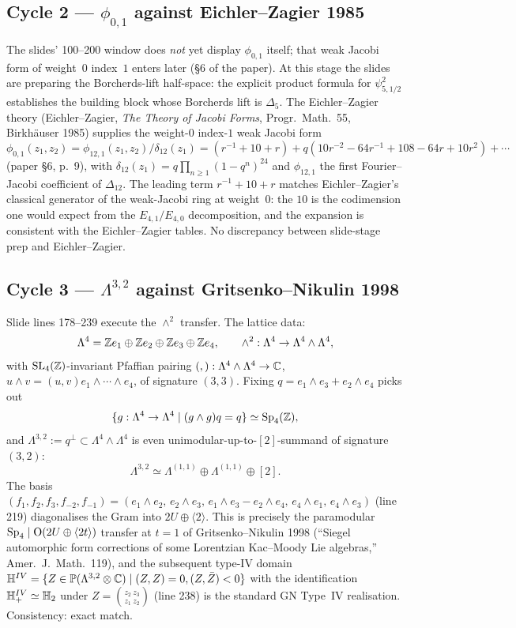 \subsection*{Cycle 2 --- $\phi_{0,1}$ against Eichler--Zagier 1985}

The slides' 100--200 window does \emph{not} yet display $\phi_{0,1}$
itself; that weak Jacobi form of weight~$0$ index~$1$ enters later (\S 6
of the paper). At this stage the slides are preparing the Borcherds-lift
half-space: the explicit product formula for $\psi_{5,1/2}^2$ establishes
the building block whose Borcherds lift is $\Delta_5$. The
Eichler--Zagier theory (Eichler--Zagier, \emph{The Theory of Jacobi
Forms}, Progr.\ Math.~55, Birkh\"auser 1985) supplies the
weight-$0$ index-$1$ weak Jacobi form
\[
\phi_{0,1}(z_1,z_2)=\phi_{12,1}(z_1,z_2)/\delta_{12}(z_1)
=(r^{-1}+10+r)+q(10r^{-2}-64r^{-1}+108-64r+10r^2)+\cdots
\]
(paper \S 6, p.~9), with $\delta_{12}(z_1)=q\prod_{n\geq 1}(1-q^n)^{24}$
and $\phi_{12,1}$ the first Fourier--Jacobi coefficient of
$\Delta_{12}$. The leading term $r^{-1}+10+r$ matches
Eichler--Zagier's classical generator of the weak-Jacobi ring at
weight~$0$: the $10$ is the codimension one would expect from the
$E_{4,1}/E_{4,0}$ decomposition, and the expansion is consistent with
the Eichler--Zagier tables. No discrepancy between slide-stage prep and
Eichler--Zagier.

\subsection*{Cycle 3 --- $\Lambda^{3,2}$ against Gritsenko--Nikulin 1998}

Slide lines 178--239 execute the $\wedge^2$ transfer. The lattice data:
\[
\Lambda^4=\mathbb{Z} e_1\oplus\mathbb{Z} e_2\oplus\mathbb{Z} e_3\oplus\mathbb{Z} e_4,\qquad
\wedge^2:\Lambda^4\to\Lambda^4\wedge\Lambda^4,
\]
with $\mathrm{SL}_4(\mathbb{Z})$-invariant Pfaffian pairing
$(,):\Lambda^4\wedge\Lambda^4\to\mathbb{C}$, $u\wedge v=(u,v)e_1\wedge\cdots
\wedge e_4$, of signature $(3,3)$. Fixing $q=e_1\wedge e_3+e_2\wedge
e_4$ picks out
\[
\{g:\Lambda^4\to\Lambda^4\mid(g\wedge g)q=q\}\simeq\mathrm{Sp}_4(\mathbb{Z}),
\]
and
$\Lambda^{3,2}:=q^{\perp}\subset\Lambda^4\wedge\Lambda^4$ is even
unimodular-up-to-$[2]$-summand of signature $(3,2)$:
\[
\Lambda^{3,2}\simeq\Lambda^{(1,1)}\oplus\Lambda^{(1,1)}\oplus[2].
\]
The basis $(f_1,f_2,f_3,f_{-2},f_{-1})=
(e_1\wedge e_2,\,e_2\wedge e_3,\,e_1\wedge e_3-e_2\wedge e_4,\,
e_4\wedge e_1,\,e_4\wedge e_3)$ (line 219) diagonalises the Gram into
$2U\oplus\langle 2\rangle$. This is precisely the paramodular
$\mathrm{Sp}_4\mid\mathrm{O}(2U\oplus\langle 2t\rangle)$ transfer at $t=1$ of
Gritsenko--Nikulin 1998 (``Siegel automorphic form corrections of some
Lorentzian Kac--Moody Lie algebras,'' Amer.\ J.\ Math.~119), and the
subsequent type-IV domain $\mathbb{H}^{IV}=\{Z\in\mathbb{P}(\Lambda^{3,2}
\otimes\mathbb{C})\mid(Z,Z)=0,(Z,\bar Z)<0\}$ with the identification
$\mathbb{H}^{IV}_+\simeq\mathbb{H}_2$ under $Z=\binom{z_2\ z_3}{z_1\ z_2}$ (line
238) is the standard GN Type~IV realisation. Consistency: exact match.

